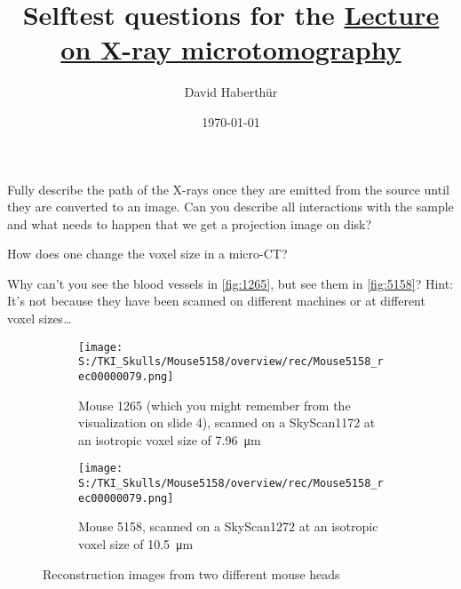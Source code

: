 \documentclass[a4paper]{exam}
\title{Selftest questions for the \href{https://ilias.unibe.ch/goto_ilias3_unibe_sess_1555744.html}{Lecture on X-ray microtomography}}
\author{David Haberthür}
\date{\today}
\begin{document}
\maketitle

\begin{questions}

\question Fully describe the path of the X-rays once they are emitted from the source until they are converted to an image. Can you describe all interactions with the sample and what needs to happen that we get a projection image on disk?

\question How does one change the voxel size in a micro-CT?

\question Why can't you see the blood vessels in \autoref{fig:1265}, but see them in \autoref{fig:5158}? Hint: It's not because they have been scanned on different machines or at different voxel sizes\ldots

\begin{figure}[htb]
	\centering
	\begin{subfigure}[t]{0.5\textwidth}
		\texttt{[image: S:/TKI\_Skulls/Mouse5158/overview/rec/Mouse5158\_rec00000079.png]}
		\caption{Mouse 1265 (which you might remember from the visualization on slide 4), scanned on a SkyScan1172 at an isotropic voxel size of \SI{7.96}{\micro\meter}}
		\label{fig:1265}
	\end{subfigure}%
	\hfill%
	\begin{subfigure}[t]{0.5\textwidth}
		\texttt{[image: S:/TKI\_Skulls/Mouse5158/overview/rec/Mouse5158\_rec00000079.png]}
		\caption{Mouse 5158, scanned on a SkyScan1272 at an isotropic voxel size of \SI{10.5}{\micro\meter}}
		\label{fig:5158}
	\end{subfigure}	
	\caption{Reconstruction images from two different mouse heads}
\end{figure}

\end{questions}
\end{document}
